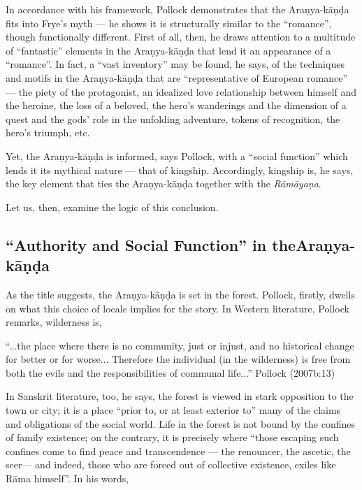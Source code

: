 In accordance with his framework, Pollock demonstrates that the Araṇya-kāṇḍa fits into Frye’s myth --- he shows it is structurally similar to the “romance”, though functionally different. First of all, then, he draws attention to a multitude of “fantastic” elements in the Araṇya-kāṇḍa that lend it an appearance of a “romance”. In fact, a “vast inventory” may be found, he says, of the techniques and motifs in the Araṇya-kāṇḍa that are “representative of European romance” --- the piety of the protagonist, an idealized love relationship between himself and the heroine, the loss of a beloved, the hero’s wanderings and the dimension of a quest and the gods’ role in the unfolding adventure, tokens of recognition, the hero’s triumph, etc.  

Yet, the Araṇya-kāṇḍa is informed, says Pollock, with a “social function” which lends it its mythical nature --- that of kingship. Accordingly, kingship is, he says, the key element that ties the Araṇya-kāṇḍa together with the {\sl Rāmāyaṇa}. 

Let us, then, examine the logic of this conclusion. 

\subsection{“Authority and Social Function” in the\break Araṇya-kāṇḍa}\label{sec2.3.1}

As the title suggests, the Araṇya-kāṇḍa is set in the forest. Pollock, firstly, dwells on what this choice of locale implies for the story. In Western literature, Pollock remarks, wilderness is, 

\begin{myquote}
“...the place where there is no community, just or injust, and no historical change for better or for worse... Therefore the individual (in the wilderness) is free from both the evils and the responsibilities of communal life...”
\hfill Pollock (2007b:13)
\end{myquote}

In Sanskrit literature, too, he says, the forest is viewed in stark opposition to the town or city; it is a place “prior to, or at least exterior to” many of the claims and obligations of the social world. Life in the forest is not bound by the confines of family existence; on the contrary, it is precisely where “those escaping such confines come to find peace and transcendence --- the renouncer, the ascetic, the seer--- and indeed, those who are forced out of collective existence, exiles like Rāma himself”. In his words,


